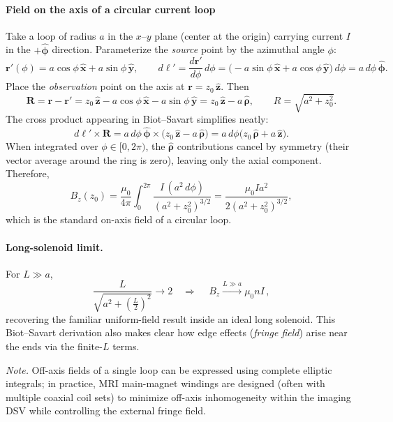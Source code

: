 \documentclass[12pt]{article}
\begin{document}
{\paragraph{Field on the axis of a circular current loop}
Take a loop of radius $a$ in the $x$--$y$ plane (center at the origin) carrying current $I$ in the $+\hat{\boldsymbol{\phi}}$ direction. Parameterize the \emph{source} point by the azimuthal angle $\phi$:
\[
\mathbf{r}'(\phi)=a\cos\phi\,\hat{\mathbf{x}}+a\sin\phi\,\hat{\mathbf{y}},\qquad
d\boldsymbol{\ell}'=\frac{d\mathbf{r}'}{d\phi}\,d\phi
=\big(-a\sin\phi\,\hat{\mathbf{x}}+a\cos\phi\,\hat{\mathbf{y}}\big)\,d\phi
= a\,d\phi\,\hat{\boldsymbol{\phi}}.
\]
Place the \emph{observation} point on the axis at $\mathbf{r}=z_0\,\hat{\mathbf{z}}$. Then
\[
\mathbf{R}=\mathbf{r}-\mathbf{r}'=z_0\,\hat{\mathbf{z}}-a\cos\phi\,\hat{\mathbf{x}}-a\sin\phi\,\hat{\mathbf{y}}
= z_0\,\hat{\mathbf{z}}-a\,\hat{\boldsymbol{\rho}},\qquad
R=\sqrt{a^2+z_0^2}.
\]
The cross product appearing in Biot--Savart simplifies neatly:
\[
d\boldsymbol{\ell}'\times\mathbf{R}
= a\,d\phi\,\hat{\boldsymbol{\phi}}\times\big(z_0\,\hat{\mathbf{z}}-a\,\hat{\boldsymbol{\rho}}\big)
= a\,d\phi\big(z_0\,\hat{\boldsymbol{\rho}}+a\,\hat{\mathbf{z}}\big).
\]
When integrated over $\phi\in[0,2\pi)$, the $\hat{\boldsymbol{\rho}}$ contributions cancel by symmetry (their vector average around the ring is zero), leaving only the axial component. Therefore,
\[
B_z(z_0)=\frac{\mu_0}{4\pi}\int_0^{2\pi}\frac{I\,(a^2\,d\phi)}{(a^2+z_0^2)^{3/2}}
=\frac{\mu_0 I a^2}{2\left(a^2+z_0^2\right)^{3/2}},
\]
which is the standard on-axis field of a circular loop.


\paragraph{Long-solenoid limit.}
For $L\gg a$,
\[
\frac{L}{\sqrt{a^2+\left(\tfrac{L}{2}\right)^2}}\to 2
\quad\Rightarrow\quad
\boxed{\,B_z \xrightarrow{L\gg a} \mu_0 n I\,},
\]
recovering the familiar uniform-field result inside an ideal long solenoid. This Biot--Savart derivation also makes clear how edge effects (\emph{fringe field}) arise near the ends via the finite-$L$ terms.

\medskip
\noindent\emph{Note.} Off-axis fields of a single loop can be expressed using complete elliptic integrals; in practice, MRI main-magnet windings are designed (often with multiple coaxial coil sets) to minimize off-axis inhomogeneity within the imaging DSV while controlling the external fringe field.

}
\end{document}
